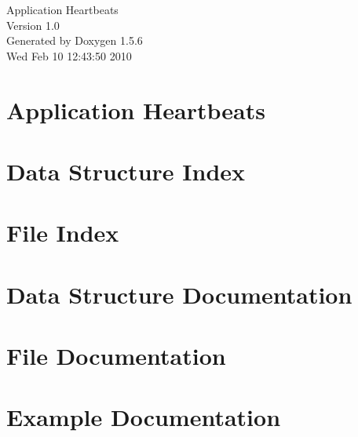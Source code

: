 \documentclass[a4paper]{book}
\begin{document}
\begin{titlepage}
\vspace*{7cm}
\begin{center}
{\Large Application Heartbeats \\[1ex]\large Version 1.0 }\\
\vspace*{1cm}
{\large Generated by Doxygen 1.5.6}\\
\vspace*{0.5cm}
{\small Wed Feb 10 12:43:50 2010}\\
\end{center}
\end{titlepage}
\clearemptydoublepage
{}
\tableofcontents
\clearemptydoublepage
{}
\chapter{Application Heartbeats}
\label{index}\hypertarget{index}{}
\chapter{Data Structure Index}

\chapter{File Index}

\chapter{Data Structure Documentation}





\chapter{File Documentation}


















\chapter{Example Documentation}




\printindex
\end{document}
